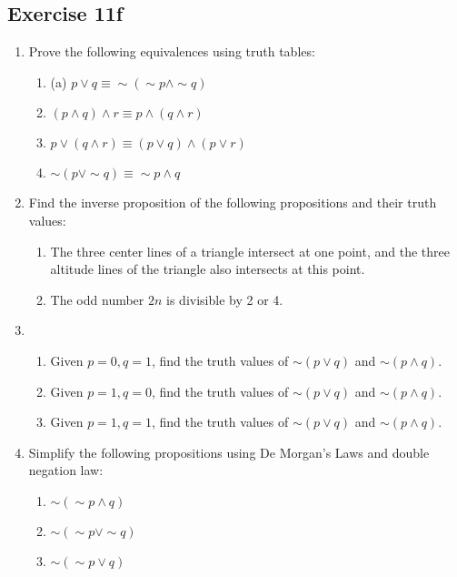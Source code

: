 \documentclass{report}
\begin{document}
\subsection*{Exercise 11f}
\begin{enumerate}
    \item Prove the following equivalences using truth tables:
          \begin{enumerate}
              \item (a) $p \vee q \equiv \sim(\sim p \wedge \sim q)$
              \item $(p \wedge q) \wedge r \equiv p \wedge(q \wedge r)$
              \item $p \vee(q \wedge r) \equiv(p \vee q) \wedge(p \vee r)$
              \item $\sim(p \vee \sim q) \equiv \sim p \wedge q$
          \end{enumerate}
    \item  Find the inverse proposition of the following propositions and their truth
          values:
          \begin{enumerate}
              \item The three center lines of a triangle intersect at one point, and the three
                    altitude lines of the triangle also intersects at this point.
              \item The odd number $2n$ is divisible by 2 or 4.
          \end{enumerate}
    \item \begin{enumerate}
              \item Given $p=0, q=1$, find the truth values of $\sim(p \vee q)$ and $\sim(p \wedge
                        q)$.
              \item Given $p=1, q=0$, find the truth values of $\sim(p \vee q)$ and $\sim(p \wedge
                        q)$.
              \item Given $p=1, q=1$, find the truth values of $\sim(p \vee q)$ and $\sim(p \wedge
                        q)$.
          \end{enumerate}
    \item Simplify the following propositions using De Morgan's Laws and double negation
          law:
          \begin{enumerate}
              \item $\sim(\sim p \wedge q)$
              \item $\sim(\sim p \vee \sim q)$
              \item $\sim(\sim p \vee q)$
          \end{enumerate}
\end{enumerate}
\end{document}
